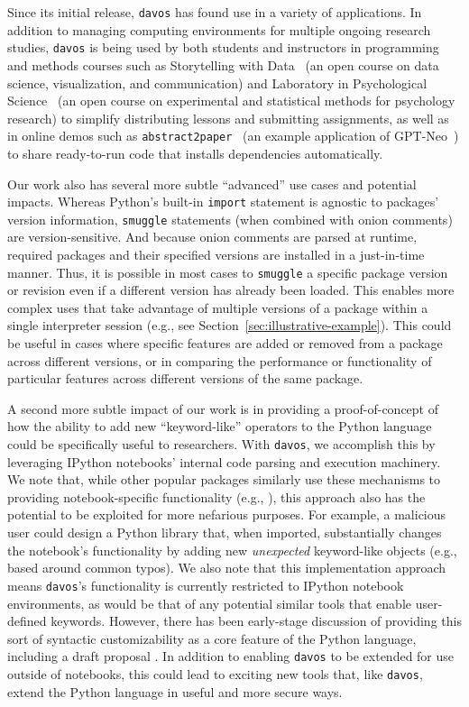 \documentclass[preprint,12pt,a4paper]{elsarticle}
\begin{document}
Since its initial release, \texttt{davos} has found use in a variety
of applications. In addition to managing computing environments
for multiple ongoing research studies, \texttt{davos} is being used by
both students and instructors in programming and methods courses such as
Storytelling with Data~\cite{Mann21d} (an open course on data science,
visualization, and communication) and Laboratory in Psychological
Science~\cite{Mann22} (an open course on experimental and statistical
methods for psychology research) to simplify distributing lessons and
submitting assignments, as well as in online demos such as
\texttt{abstract2paper}~\cite{Mann21e} (an example application of
GPT-Neo~\cite{GaoEtal20, BlacEtal21}) to share ready-to-run code that
installs dependencies automatically.

Our work also has several more subtle ``advanced'' use cases and
potential impacts. Whereas Python's built-in \texttt{import}
statement is agnostic to packages' version information, \texttt{smuggle}
statements (when combined with onion comments) are version-sensitive.
And because onion comments are parsed at runtime, required packages and
their specified versions are installed in a just-in-time manner. Thus, it is possible
in most cases to \texttt{smuggle} a specific package version or revision even if
a different version has already been loaded. This enables more complex uses
that take advantage of multiple versions of a package within a single interpreter
session (e.g., see Section~\ref{sec:illustrative-example}). This could be useful in cases where specific features are added or
removed from a package across different versions, or in comparing the
performance or functionality of particular features across different versions of
the same package.

A second more subtle impact of our work is in providing a proof-of-concept of how the ability to add new ``keyword-like'' operators to the Python language could be specifically useful to researchers. With \texttt{davos}, we accomplish this by leveraging IPython notebooks' internal code parsing and execution machinery. We note that, while other popular packages similarly use these mechanisms to providing notebook-specific functionality (e.g., \cite{Hunt07,HeusEtal18a}), this approach also has the potential to be exploited for more nefarious purposes. For example, a malicious user could design a Python library that, when imported, substantially changes the notebook's functionality by adding new \textit{unexpected} keyword-like objects (e.g., based around common typos). We also note that this implementation approach means \texttt{davos}'s functionality is currently restricted to IPython notebook environments, as would be that of any potential similar tools that enable user-defined keywords. However, there has been early-stage discussion of providing this sort of syntactic customizability as a core feature of the Python language, including a draft proposal \cite{Shan20}. In addition to enabling \texttt{davos} to be extended for use outside of notebooks, this could lead to exciting new tools that, like \texttt{davos}, extend the Python language in useful and more secure ways.
\end{document}
